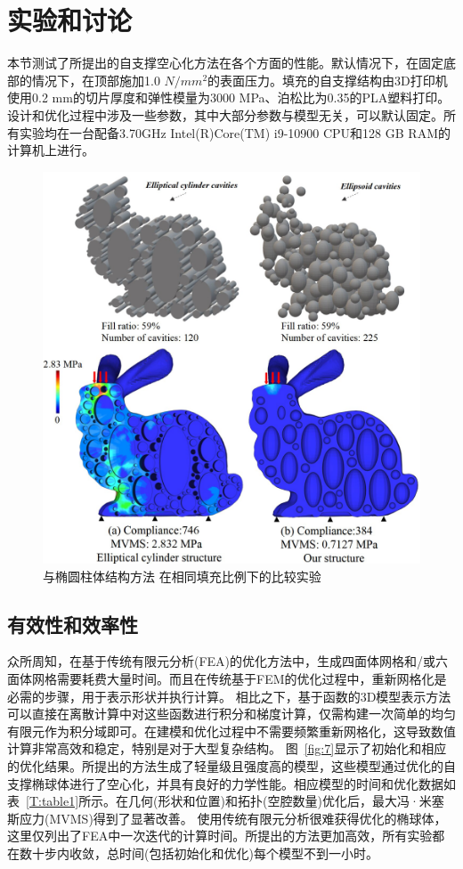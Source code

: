 \section{实验和讨论}
本节测试了所提出的自支撑空心化方法在各个方面的性能。默认情况下，在固定底部的情况下，在顶部施加1.0 $N/mm^2$的表面压力。填充的自支撑结构由3D打印机使用0.2 mm的切片厚度和弹性模量为3000 MPa、泊松比为0.35的PLA塑料打印。
设计和优化过程中涉及一些参数，其中大部分参数与模型无关，可以默认固定。所有实验均在一台配备3.70GHz Intel(R)Core(TM) i9-10900 CPU和128 GB RAM的计算机上进行。

\begin{figure}[htbp]
  \begin {center}
  \includegraphics[width=0.65 \textwidth]{./figures/self-support/fig10.png}
  \caption{与椭圆柱体结构方法 \cite{lee2018support} 在相同填充比例下的比较实验 }
  \label{fig:9}
  \end {center}
\end{figure}

\subsection{有效性和效率性}
众所周知，在基于传统有限元分析(FEA)的优化方法中，生成四面体网格和/或六面体网格需要耗费大量时间。而且在传统基于FEM的优化过程中，重新网格化是必需的步骤，用于表示形状并执行计算。
相比之下，基于函数的3D模型表示方法可以直接在离散计算中对这些函数进行积分和梯度计算，仅需构建一次简单的均匀有限元作为积分域即可。在建模和优化过程中不需要频繁重新网格化，这导致数值计算非常高效和稳定，特别是对于大型复杂结构。
图~\ref{fig:7}显示了初始化和相应的优化结果。所提出的方法生成了轻量级且强度高的模型，这些模型通过优化的自支撑椭球体进行了空心化，并具有良好的力学性能。相应模型的时间和优化数据如表~\ref{T:table1}所示。在几何(形状和位置)和拓扑(空腔数量)优化后，最大冯·米塞斯应力(MVMS)得到了显著改善。
使用传统有限元分析很难获得优化的椭球体，这里仅列出了FEA中一次迭代的计算时间。所提出的方法更加高效，所有实验都在数十步内收敛，总时间(包括初始化和优化)每个模型不到一小时。

